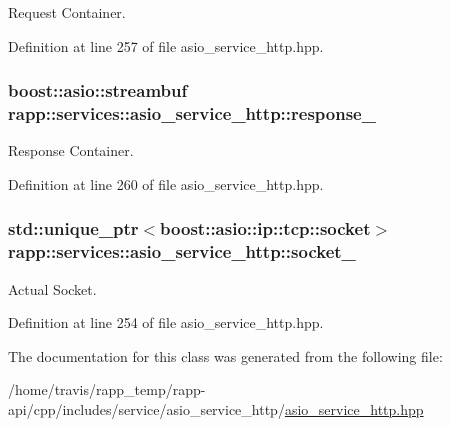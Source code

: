 Request Container. 



Definition at line 257 of file asio\-\_\-service\-\_\-http.\-hpp.

\hypertarget{classrapp_1_1services_1_1asio__service__http_a5b1a5c59d1407fec9f0ccbe372bdac3a}{
\subsubsection[{response\-\_\-}]{\setlength{\rightskip}{0pt plus 5cm}boost\-::asio\-::streambuf rapp\-::services\-::asio\-\_\-service\-\_\-http\-::response\-\_\-\hspace{0.3cm}{\ttfamily [protected]}}}\label{classrapp_1_1services_1_1asio__service__http_a5b1a5c59d1407fec9f0ccbe372bdac3a}


Response Container. 



Definition at line 260 of file asio\-\_\-service\-\_\-http.\-hpp.

\hypertarget{classrapp_1_1services_1_1asio__service__http_ad3411584026eb6c31ac78943266e7858}{
\subsubsection[{socket\-\_\-}]{\setlength{\rightskip}{0pt plus 5cm}std\-::unique\-\_\-ptr$<$boost\-::asio\-::ip\-::tcp\-::socket$>$ rapp\-::services\-::asio\-\_\-service\-\_\-http\-::socket\-\_\-\hspace{0.3cm}{\ttfamily [protected]}}}\label{classrapp_1_1services_1_1asio__service__http_ad3411584026eb6c31ac78943266e7858}


Actual Socket. 



Definition at line 254 of file asio\-\_\-service\-\_\-http.\-hpp.



The documentation for this class was generated from the following file\-:\begin{DoxyCompactItemize}
\item 
/home/travis/rapp\-\_\-temp/rapp-\/api/cpp/includes/service/asio\-\_\-service\-\_\-http/\hyperlink{asio__service__http_8hpp}{asio\-\_\-service\-\_\-http.\-hpp}\end{DoxyCompactItemize}
